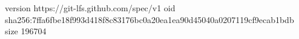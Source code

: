 version https://git-lfs.github.com/spec/v1
oid sha256:7ffa6fbe18f993d418f8c83176bc0a20ea1ea90d45040a0207119cf9ecab1bdb
size 196704
